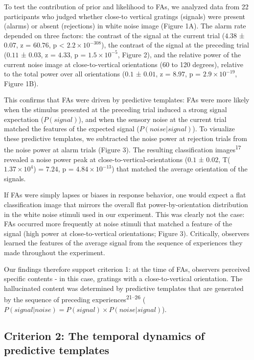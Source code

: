 \documentclass[
]{article}
\begin{document}
To test the contribution of prior and likelihood to FAs, we analyzed
data from 22 participants who judged whether close-to vertical gratings
(signals) were present (alarms) or absent (rejections) in white noise
image (Figure 1A). The alarm rate depended on three factors: the
contrast of the signal at the current trial (\(4.38\) ± \(0.07\), z =
\(60.76\), p < \(\ensuremath{2.2\times 10^{-308}}\)), the contrast of the signal at the preceding trial
(\(0.11\) ± \(0.03\), z = \(4.33\), p =
\(\ensuremath{1.5\times 10^{-5}}\), Figure 2), and the relative power of
the current noise image at close-to-vertical orientations (60 to 120
degrees), relative to the total power over all orientations (\(0.1\) ±
\(0.01\), z = \(8.97\), p = \(\ensuremath{2.9\times 10^{-19}}\), Figure
1B).

This confirms that FAs were driven by predictive templates: FAs were
more likely when the stimulus presented at the preceding trial induced a
strong signal expectation (\(P(signal)\)), and when the sensory noise at
the current trial matched the features of the expected signal
(\(P(noise|signal)\)). To visualize these predictive templates, we
subtracted the noise power at rejection trials from the noise power at
alarm trials (Figure 3). The resulting classification
images\textsuperscript{17} revealed a noise power peak at
close-to-vertical-orientations (\(0.1\) ± \(0.02\),
T(\(\ensuremath{1.37\times 10^{4}}\)) = \(7.24\), p =
\(\ensuremath{4.84\times 10^{-13}}\)) that matched the average
orientation of the signals.

If FAs were simply lapses or biases in response behavior, one would
expect a flat classification image that mirrors the overall flat
power-by-orientation distribution in the white noise stimuli used in our
experiment. This was clearly not the case: FAs occurred more frequently
at noise stimuli that matched a feature of the signal (high power at
close-to-vertical orientations; Figure 3). Critically, observers learned
the features of the average signal from the sequence of experiences they
made throughout the experiment.

Our findings therefore support criterion 1: at the time of FAs,
observers perceived specific contents - in this case, gratings with a
close-to-vertical orientation. The hallucinated content was determined
by predictive templates that are generated by the sequence of preceding
experiences\textsuperscript{21--26}
(\(P(signal|noise) = P(signal) \times P(noise|signal)\)).

\hypertarget{criterion-2-the-temporal-dynamics-of-predictive-templates}{%
\subsection{Criterion 2: The temporal dynamics of predictive
templates}\label{criterion-2-the-temporal-dynamics-of-predictive-templates}}
\end{document}

